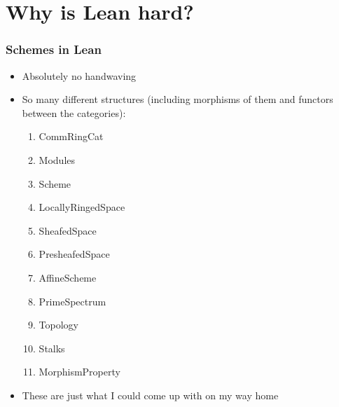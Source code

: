 \documentclass{beamer}
\begin{document}
\section{Why is Lean hard?}

\begin{frame}
    \frametitle{Schemes in Lean}

    \begin{itemize}
        \item Absolutely no handwaving

        \item So many different structures (including morphisms of them and
              functors between the categories):

              \begin{multicols}{2}
                  \begin{enumerate}
                      \item CommRingCat
                      \item Modules
                      \item Scheme
                      \item LocallyRingedSpace
                      \item SheafedSpace
                      \item PresheafedSpace
                      \item AffineScheme
                      \item PrimeSpectrum
                      \item Topology
                      \item Stalks
                      \item MorphismProperty
                  \end{enumerate}
              \end{multicols}
        \item These are just what I could come up with on my way home
    \end{itemize}
\end{frame}
\end{document}
